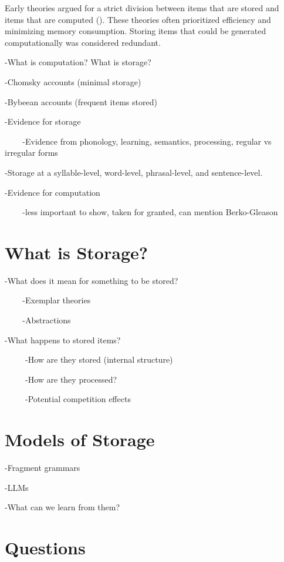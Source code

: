 \documentclass[
  letterpaper,
  DIV=11,
  numbers=noendperiod,
  nottoc]{scrreprt}
\begin{document}
Early theories argued for a strict division between items that are
stored and items that are computed (). These theories often prioritized efficiency and minimizing
memory consumption. Storing items that could be generated
computationally was considered redundant.

-What is computation? What is storage?

-Chomsky accounts (minimal storage)

-Bybeean accounts (frequent items stored)

-Evidence for storage

~ ~ ~-Evidence from phonology, learning, semantics, processing, regular
vs irregular forms

-Storage at a syllable-level, word-level, phrasal-level, and
sentence-level.

-Evidence for computation

~ ~ ~-less important to show, taken for granted, can mention
Berko-Gleason

\section{What is Storage?}\label{what-is-storage}

-What does it mean for something to be stored?

~ ~ ~-Exemplar theories

~ ~ ~-Abstractions

-What happens to stored items?~~

~ ~ ~ -How are they stored (internal structure)

~ ~ ~ -How are they processed?

~ ~ ~ -Potential competition effects~

\section{\texorpdfstring{\textbf{Models of
Storage}}{Models of Storage}}\label{models-of-storage}

-Fragment grammars

-LLMs

-What can we learn from them?

\section{\texorpdfstring{\textbf{Q}uestions}{Questions}}\label{questions}
\end{document}
